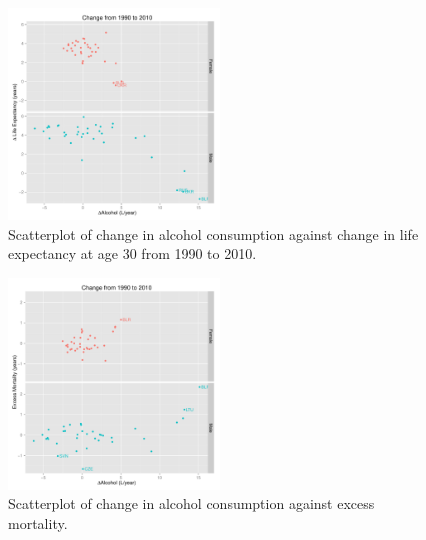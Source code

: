\documentclass{article}
\begin{document}
\begin{figure}[h]
\centering
\includegraphics[width = 0.5\textwidth]{etoh_lifeexp.pdf}
\caption{Scatterplot of change in alcohol consumption against change in life expectancy at age 30 from 1990 to 2010.}\label{fig:etoh_lifeexp}
\end{figure}

\begin{figure}[h]
\centering
\includegraphics[width = 0.5\textwidth]{etoh_exmort.pdf}
\caption{Scatterplot of change in alcohol consumption against excess mortality.}\label{fig:etoh_excessmortality}
\end{figure}
\end{document}
